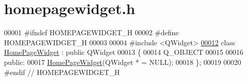 \hypertarget{homepagewidget_8h_source}{}\section{homepagewidget.\+h}
\label{homepagewidget_8h_source}

\begin{DoxyCode}
00001 \textcolor{preprocessor}{#ifndef HOMEPAGEWIDGET\_H}
00002 \textcolor{preprocessor}{#define HOMEPAGEWIDGET\_H}
00003 
00004 \textcolor{preprocessor}{#include <QWidget>}
\hypertarget{homepagewidget_8h_source.tex_l00012}{}\hyperlink{classHomePageWidget}{00012} \textcolor{keyword}{class }\hyperlink{classHomePageWidget}{HomePageWidget} : \textcolor{keyword}{public} QWidget
00013 \{
00014     Q\_OBJECT
00015 
00016 \textcolor{keyword}{public}:
00017     \hyperlink{classHomePageWidget_a72947da81d3ac3ce6edc9da05fd809ac}{HomePageWidget}(QWidget * = NULL);
00018 \};
00019 
00020 \textcolor{preprocessor}{#endif // HOMEPAGEWIDGET\_H}
\end{DoxyCode}
